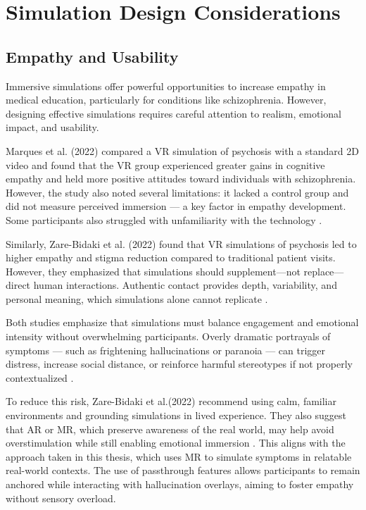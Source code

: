 \section{Simulation Design Considerations}
\subsection{Empathy and Usability}
Immersive simulations offer powerful opportunities to increase empathy in medical education, particularly for conditions like schizophrenia. However, designing effective simulations requires careful attention to realism, emotional impact, and usability.

Marques et al. (2022) compared a VR simulation of psychosis with a standard 2D video and found that the VR group experienced greater gains in cognitive empathy and held more positive attitudes toward individuals with schizophrenia. However, the study also noted several limitations: it lacked a control group and did not measure perceived immersion — a key factor in empathy development. Some participants also struggled with unfamiliarity with the technology \cite{Marques2022}.

Similarly, Zare-Bidaki et al. (2022) found that VR simulations of psychosis led to higher empathy and stigma reduction compared to traditional patient visits. However, they emphasized that simulations should supplement—not replace—direct human interactions. Authentic contact provides depth, variability, and personal meaning, which simulations alone cannot replicate \cite{Zare-Bidaki2022, Hsia2022}.

Both studies emphasize that simulations must balance engagement and emotional intensity without overwhelming participants. Overly dramatic portrayals of symptoms — such as frightening hallucinations or paranoia — can trigger distress, increase social distance, or reinforce harmful stereotypes if not properly contextualized \cite{Ando2011, Chaffin2013, Zare-Bidaki2022}.

To reduce this risk, Zare-Bidaki et al.(2022) recommend using calm, familiar environments and grounding simulations in lived experience. They also suggest that AR or MR, which preserve awareness of the real world, may help avoid overstimulation while still enabling emotional immersion \cite{Zare-Bidaki2022}. This aligns with the approach taken in this thesis, which uses MR to simulate symptoms in relatable real-world contexts. The use of passthrough features allows participants to remain anchored while interacting with hallucination overlays, aiming to foster empathy without sensory overload.

